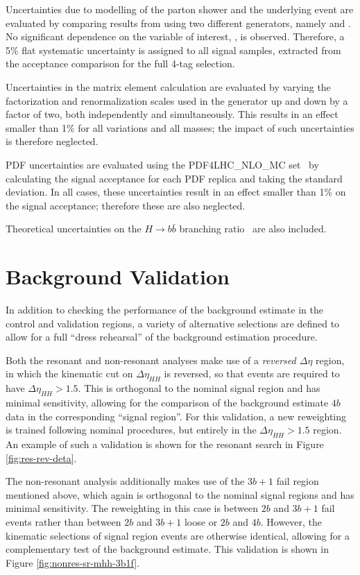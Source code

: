 Uncertainties due to modelling of the parton shower and the underlying event are 
evaluated by comparing results from using two different generators, namely \HERWIG[7.1.3]
and \PYTHIA[8.235]. No significant dependence on the variable of interest, \mhh, is observed.
Therefore, a 5\% flat systematic uncertainty is assigned to all signal samples, extracted from 
the acceptance comparison for the full 4-tag selection.

Uncertainties in the matrix element calculation are evaluated by varying the factorization 
and renormalization scales used in the generator up and down by a factor of two, both independently and simultaneously.
This results in an effect smaller than 1\% for all variations and all masses; the impact of such uncertainties 
is therefore neglected.

PDF uncertainties are evaluated using the PDF4LHC\_NLO\_MC set~\cite{Butterworth:2015oua} by 
calculating the signal acceptance for each PDF replica and taking the standard deviation. 
In all cases, these uncertainties result in an effect smaller than 1\% on the signal acceptance; 
therefore these are also neglected.

Theoretical uncertainties on the $H \to b\bar{b}$ branching ratio~\cite{deFlorian:2227475} are also 
included.

\FloatBarrier
\clearpage
\section{Background Validation}
\label{sec:bkgd-validation}
In addition to checking the performance of the background estimate in the control and 
validation regions, a variety of alternative selections are defined to allow for a 
full ``dress rehearsal'' of the background estimation procedure. 

Both the resonant and non-resonant analyses make use of a \emph{reversed $\Delta \eta$}
region, in which the kinematic cut on $\Delta \eta_{HH}$ is reversed, so that events are
required to have $\Delta \eta_{HH} > 1.5$. This is orthogonal to the nominal signal 
region and has minimal sensitivity, allowing for the comparison of the background
estimate $4b$ data in the corresponding ``signal region''. For this validation, 
a new reweighting is trained following nominal procedures, but entirely in the 
$\Delta \eta_{HH} > 1.5$ region. An example of such a validation is shown for the 
resonant search in Figure \ref{fig:res-rev-deta}.

The non-resonant analysis additionally makes use of the $3b+1$ fail region mentioned 
above, which again is orthogonal to the nominal signal regions and has minimal sensitivity.
The reweighting in this case is between $2b$ and $3b+1$ fail events rather than between 
$2b$ and $3b+1$ loose or $2b$ and $4b$. However, the kinematic selections of signal 
region events are otherwise identical, allowing for a complementary test of the 
background estimate. This validation is shown in Figure \ref{fig:nonres-sr-mhh-3b1f}.

